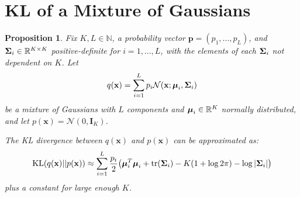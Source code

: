 \documentclass{article} %
\newcommand{\R}{\mathbb{R}}
\newcommand{\N}{\mathcal{N}}
\newcommand{\x}{\mathbf{x}}
\newcommand{\I}{\mathbf{I}}
\newcommand{\bSigma}{\text{\boldmath$\Sigma$}}
\newcommand{\bmu}{\text{\boldmath$\mu$}}
\newcommand{\tr}{\text{tr}}
\newcommand{\KL}{\text{KL}}
\newtheorem{proposition}{Proposition}
\theoremstyle{definition}
\begin{document}
\section{KL of a Mixture of Gaussians}
\begin{proposition} \label{prop:KL_mixture_of_Gaussians}
Fix $K, L \in \mathbb{N}$, a probability vector $\mathbf{p}=(p_1, ..., p_L)$, and $\bSigma_i \in \mathbb{R}^{K \times K}$ positive-definite for $i=1, ..., L$, with the elements of each $\bSigma_i$ not dependent on $K$. 
Let 
\begin{align*}
q(\x) = \sum_{i=1}^L p_i \N(\x; \bmu_i, \bSigma_i)
\end{align*}
be a mixture of Gaussians with $L$ components and $\bmu_i \in \R^K$ normally distributed, and let $p(\x) = \N(0, \I_K)$.

The KL divergence between $q(\x)$ and $p(\x)$ can be approximated as:
\begin{align*}
\KL(q(\x) || p(\x)) \approx
\sum_{i=1}^L \frac{p_i}{2} \big( \bmu_i^T \bmu_i + \tr(\bSigma_i) - K(1+\log 2 \pi) - \log | \bSigma_i | \big)
\end{align*}
plus a constant for large enough $K$.
\end{proposition}
\end{document}
